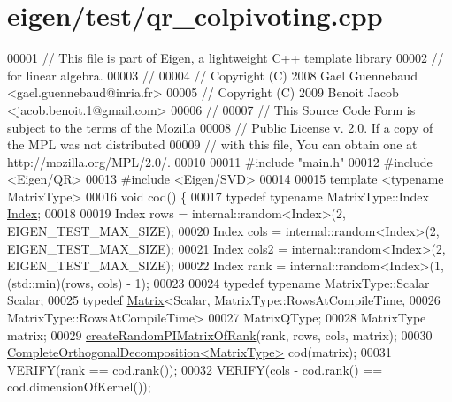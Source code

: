 \hypertarget{eigen_2test_2qr__colpivoting_8cpp_source}{}\section{eigen/test/qr\+\_\+colpivoting.cpp}
\label{eigen_2test_2qr__colpivoting_8cpp_source}

\begin{DoxyCode}
00001 \textcolor{comment}{// This file is part of Eigen, a lightweight C++ template library}
00002 \textcolor{comment}{// for linear algebra.}
00003 \textcolor{comment}{//}
00004 \textcolor{comment}{// Copyright (C) 2008 Gael Guennebaud <gael.guennebaud@inria.fr>}
00005 \textcolor{comment}{// Copyright (C) 2009 Benoit Jacob <jacob.benoit.1@gmail.com>}
00006 \textcolor{comment}{//}
00007 \textcolor{comment}{// This Source Code Form is subject to the terms of the Mozilla}
00008 \textcolor{comment}{// Public License v. 2.0. If a copy of the MPL was not distributed}
00009 \textcolor{comment}{// with this file, You can obtain one at http://mozilla.org/MPL/2.0/.}
00010 
00011 \textcolor{preprocessor}{#include "main.h"}
00012 \textcolor{preprocessor}{#include <Eigen/QR>}
00013 \textcolor{preprocessor}{#include <Eigen/SVD>}
00014 
00015 \textcolor{keyword}{template} <\textcolor{keyword}{typename} MatrixType>
00016 \textcolor{keywordtype}{void} cod() \{
00017   \textcolor{keyword}{typedef} \textcolor{keyword}{typename} MatrixType::Index \hyperlink{namespace_eigen_a62e77e0933482dafde8fe197d9a2cfde}{Index};
00018 
00019   Index rows = internal::random<Index>(2, EIGEN\_TEST\_MAX\_SIZE);
00020   Index cols = internal::random<Index>(2, EIGEN\_TEST\_MAX\_SIZE);
00021   Index cols2 = internal::random<Index>(2, EIGEN\_TEST\_MAX\_SIZE);
00022   Index rank = internal::random<Index>(1, (std::min)(rows, cols) - 1);
00023 
00024   \textcolor{keyword}{typedef} \textcolor{keyword}{typename} MatrixType::Scalar Scalar;
00025   \textcolor{keyword}{typedef} \hyperlink{group___core___module_class_eigen_1_1_matrix}{Matrix}<Scalar, MatrixType::RowsAtCompileTime,
00026                  MatrixType::RowsAtCompileTime>
00027       MatrixQType;
00028   MatrixType matrix;
00029   \hyperlink{namespace_eigen_a0d9a7ddcee5c7c8defaba3628455efb2}{createRandomPIMatrixOfRank}(rank, rows, cols, matrix);
00030   \hyperlink{group___q_r___module_class_eigen_1_1_complete_orthogonal_decomposition}{CompleteOrthogonalDecomposition<MatrixType>} cod(matrix);
00031   VERIFY(rank == cod.rank());
00032   VERIFY(cols - cod.rank() == cod.dimensionOfKernel());

\end{DoxyCode}
